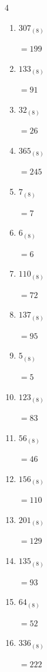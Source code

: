 \begin{multicols}{4}
\begin{enumerate}
  \item $307_{(8)}$

        $=199$

\columnbreak %

  \item $133_{(8)}$

        $=91$

  \item $32_{(8)}$

        $=26$

  \item $365_{(8)}$

        $=245$

  \item $7_{(8)}$

        $=7$

  \item $6_{(8)}$

        $=6$

  \item $110_{(8)}$

        $=72$

  \item $137_{(8)}$

        $=95$

  \item $5_{(8)}$

        $=5$

  \item $123_{(8)}$

        $=83$

  \item $56_{(8)}$

        $=46$

  \item $156_{(8)}$

        $=110$

  \item $201_{(8)}$

        $=129$

  \item $135_{(8)}$

        $=93$

  \item $64_{(8)}$

        $=52$

  \item $336_{(8)}$

        $=222$

\columnbreak %


\end{enumerate}
\end{multicols}
